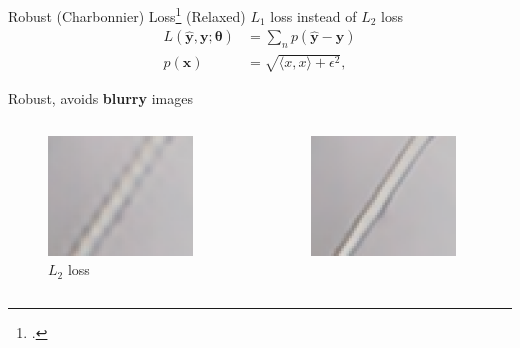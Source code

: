 \documentclass{beamer}
\begin{document}
\begin{frame}{Robust (Charbonnier) Loss\footcite{LapSRN}}
(Relaxed) $L_1$  loss instead of $L_2$ loss
\begin{align*}
    \label{eq:charbonnier}
    L( \hat{\bm{y}}, \bm{y}; \bm{\theta}) &= \sum_n p \left( \bm{\hat{y}} - \bm{y} \right)\\
    p(\bm{x}) &= \sqrt{ \langle x, x \rangle  + \epsilon^2},
  \end{align*}

Robust, avoids \textbf{blurry} images

\begin{columns}
  \begin{column}{0.33\linewidth}
    \begin{figure}[h]
      \centering
        \includegraphics[width=0.9\textwidth]{loss_functions_lap_l2}
      \caption*{$L_2$ loss}
    \end{figure}
  \end{column}
  \begin{column}{0.33\linewidth}
    \begin{figure}[h]
      \centering
        \includegraphics[width=0.9\textwidth]{loss_functions_lap_l1}

\end{figure}
\end{column}
\end{columns}
\end{frame}
\end{document}

